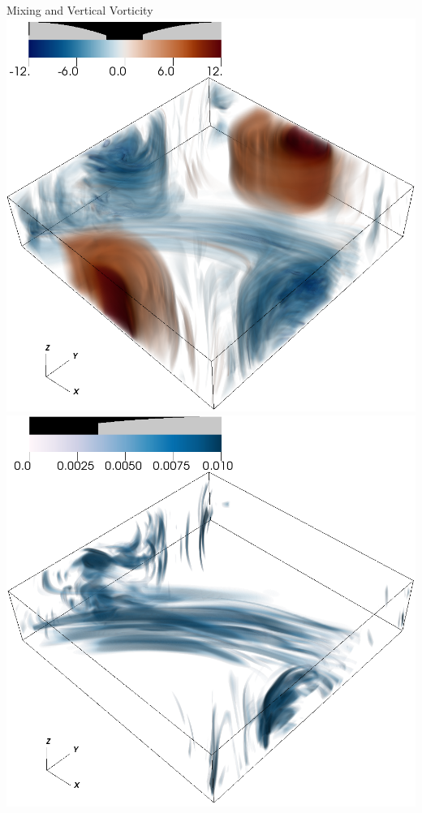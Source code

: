 \documentclass{beamer}
\begin{document}
\begin{frame}{Mixing and Vertical Vorticity}
        \includegraphics[width=.95\textwidth]{images/vortz_Om10_vr2.png}
        \includegraphics[width=.95\textwidth]{images/chi_Om10_vr2.png}
    \emp


\end{frame}
\end{document}
